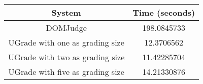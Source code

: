 \begin{tabular}{| c | c |}
    \hline
    System & Time (seconds) \\
    \hline
    \hline
    DOMJudge & 198.0845733 \\
    \hline
    UGrade with one as grading size & 12.3706562 \\
    \hline
    UGrade with two as grading size & 11.42285704 \\
    \hline
    UGrade with five as grading size & 14.21330876 \\
    \hline
\end{tabular}